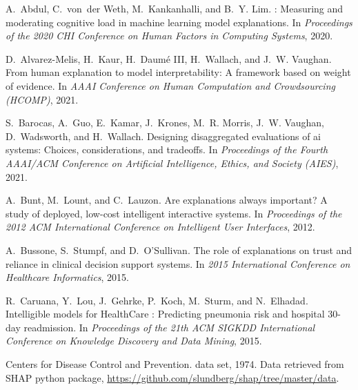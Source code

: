 \documentclass[11pt,dvipdfmx]{article}
\begin{document}
\begin{thebibliography}{10}
\itemsep=1pt
\begin{small}


A.~Abdul, C.~von~der Weth, M.~Kankanhalli, and B.~Y. Lim.
: {M}easuring and moderating cognitive load in machine
  learning model explanations.
\newblock In \emph{Proceedings of the 2020 CHI Conference on Human Factors in Computing
  Systems}, 2020.

D.~Alvarez-Melis, H.~Kaur, H.~{Daum\'e III}, H.~Wallach, and J.~W. Vaughan.
\newblock From human explanation to model interpretability: {A} framework based
  on weight of evidence.
\newblock In \emph{AAAI Conference on Human Computation and Crowdsourcing
  (HCOMP)}, 2021.

S.~Barocas, A.~Guo, E.~Kamar, J.~Krones, M.~R. Morris, J.~W. Vaughan,
  D.~Wadsworth, and H.~Wallach.
\newblock Designing disaggregated evaluations of ai systems: {C}hoices,
  considerations, and tradeoffs.
\newblock In \emph{Proceedings of the Fourth AAAI/ACM Conference on Artificial
  Intelligence, Ethics, and Society (AIES)}, 2021.

A.~Bunt, M.~Lount, and C.~Lauzon.
\newblock Are explanations always important? {A} study of deployed, low-cost
  intelligent interactive systems.
\newblock In \emph{Proceedings of the 2012 ACM International Conference on
  Intelligent User Interfaces}, 2012.

A.~Bussone, S.~Stumpf, and D.~O'Sullivan.
\newblock The role of explanations on trust and reliance in clinical decision
  support systems.
\newblock In \emph{2015 International Conference on Healthcare Informatics},
  2015.

R.~Caruana, Y.~Lou, J.~Gehrke, P.~Koch, M.~Sturm, and N.~Elhadad.
\newblock Intelligible models for {HealthCare} : Predicting pneumonia risk and
  hospital 30-day readmission.
\newblock In \emph{Proceedings of the 21th ACM SIGKDD International Conference
  on Knowledge Discovery and Data Mining}, 2015.

{Centers for Disease Control and Prevention}.
 data set, 1974.
\newblock Data retrieved from SHAP python package,
  \url{https://github.com/slundberg/shap/tree/master/data}.


\end{small}
\end{thebibliography}
\end{document}
